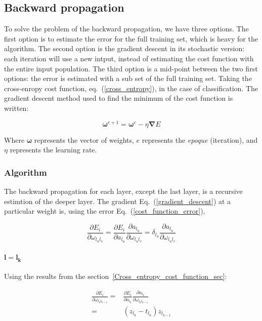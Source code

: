 \documentclass[final, paper=letter,5p,times,twocolumn]{elsarticle}
\begin{document}
\subsection{Backward propagation}

To solve the problem of the backward propagation, we have three options. The first option is to estimate the error for the full training set, which is heavy for the algorithm. The second option is the gradient descent in its stochastic version: each iteration will use a new intput, instead of estimating the cost function with the entire input population. The third option is a mid-point between the two first options: the error is estimated with a sub set of the full training set.
Taking the cross-enropy cost function, eq.~(\ref{cross_entropy}), in the case of classification. The gradient descent method used to find the minimum of the cost function is written:

\begin{equation}
  \bm{\omega}^{e+1} = \bm{\omega}^{e} - \eta \bm{\nabla} E
  \label{gradient_descent}
\end{equation}

Where $\bm{\omega}$ represents the vector of weights, $e$ represents the {\it epoque} (iteration), and $\eta$ represents the learning rate. 


\subsubsection{Algorithm}

The backward propagation for each layer, except the last layer, is a recursive estimtion of the deeper layer. The gradient Eq.~(\ref{gradient_descent}) at a particular weight is, using the error Eq.~(\ref{cost_function_error}),

\begin{equation*}
  \frac{\partial E_{i}}{\partial \omega_{l_{u}l_{v}}} = \frac{\partial E_{i}}{\partial a_{l_{u}}} \frac{\partial a_{l_{u}}}{\partial \omega_{l_{u}l_{v}}} = \delta_{l_{u}}\frac{\partial a_{l_{u}}}{\partial \omega_{l_{u}l_{v}}} 
\end{equation*}


\paragraph{$\bm{l = l_{k}}$}{ Using the results from the section~\ref{Cross_entropy_cost_function_sec}:

  \begin{equation*}
    \begin{split}
      \frac{\partial E_{i}}{\partial \omega_{l_{k}l_{k-1}}} = &  \frac{\partial E_{i}}{\partial a_{l_{k}}} \frac{\partial a_{l_{k}}}{\partial \omega_{l_{k}l_{k-1}}}  \\
              = &  (z_{l_{k}} - t_{l_{k}})z_{l_{k-1}} \\
    \end{split}
  \end{equation*}

}
\end{document}
